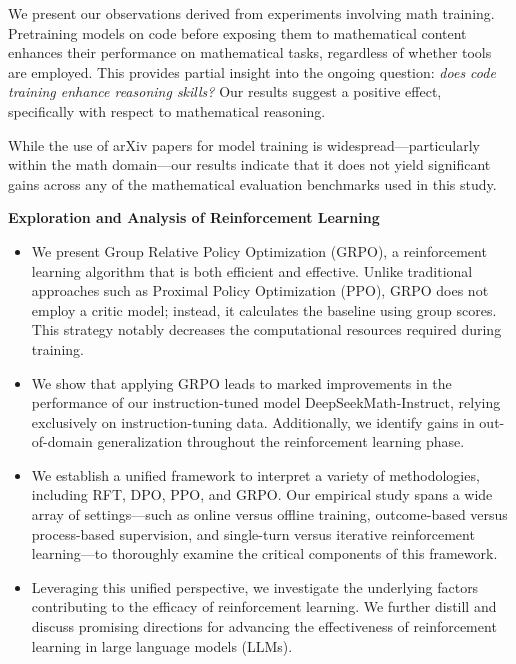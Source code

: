 \item We present our observations derived from experiments involving math training. Pretraining models on code before exposing them to mathematical content enhances their performance on mathematical tasks, regardless of whether tools are employed. This provides partial insight into the ongoing question: \textit{does code training enhance reasoning skills?} Our results suggest a positive effect, specifically with respect to mathematical reasoning.

\item While the use of arXiv papers for model training is widespread—particularly within the math domain—our results indicate that it does not yield significant gains across any of the mathematical evaluation benchmarks used in this study.

\textbf{Exploration and Analysis of Reinforcement Learning}

\begin{itemize}[topsep=0pt]
    \item We present Group Relative Policy Optimization (GRPO), a reinforcement learning algorithm that is both efficient and effective. Unlike traditional approaches such as Proximal Policy Optimization (PPO), GRPO does not employ a critic model; instead, it calculates the baseline using group scores. This strategy notably decreases the computational resources required during training.
    \item We show that applying GRPO leads to marked improvements in the performance of our instruction-tuned model DeepSeekMath-Instruct, relying exclusively on instruction-tuning data. Additionally, we identify gains in out-of-domain generalization throughout the reinforcement learning phase.
    \item We establish a unified framework to interpret a variety of methodologies, including RFT, DPO, PPO, and GRPO. Our empirical study spans a wide array of settings—such as online versus offline training, outcome-based versus process-based supervision, and single-turn versus iterative reinforcement learning—to thoroughly examine the critical components of this framework.
    \item Leveraging this unified perspective, we investigate the underlying factors contributing to the efficacy of reinforcement learning. We further distill and discuss promising directions for advancing the effectiveness of reinforcement learning in large language models (LLMs).
\end{itemize}

